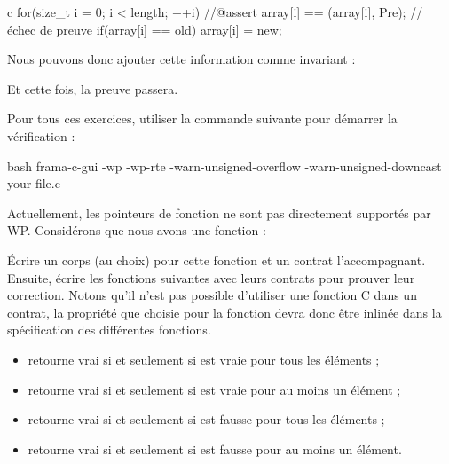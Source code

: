 \begin{CodeBlock}{c}
for(size_t i = 0; i < length; ++i){
    //@assert array[i] == \at(array[i], Pre); // échec de preuve
    if(array[i] == old) array[i] = new;
}
\end{CodeBlock}


Nous pouvons donc ajouter cette information comme invariant :




Et cette fois, la preuve passera.




Pour tous ces exercices, utiliser la commande suivante pour démarrer la vérification :

\begin{CodeBlock}{bash}
frama-c-gui -wp -wp-rte -warn-unsigned-overflow -warn-unsigned-downcast your-file.c
\end{CodeBlock}




Actuellement, les pointeurs de fonction ne sont pas directement supportés par WP.
Considérons que nous avons une fonction :




Écrire un corps (au choix) pour cette fonction et un contrat l'accompagnant.
Ensuite, écrire les fonctions suivantes avec leurs contrats pour prouver leur
correction. Notons qu'il n'est pas possible d'utiliser une fonction C dans un
contrat, la propriété que choisie pour la fonction 
devra donc être inlinée dans la spécification des différentes fonctions.


\begin{itemize}
\item {} retourne vrai si et seulement si 
  est vraie pour tous les éléments ;
\item {} retourne vrai si et seulement si 
  est vraie pour au moins un élément ;
\item {} retourne vrai si et seulement si 
  est fausse pour tous les éléments ;
\item {} retourne vrai si et seulement si 
  est fausse pour au moins un élément.
\end{itemize}


